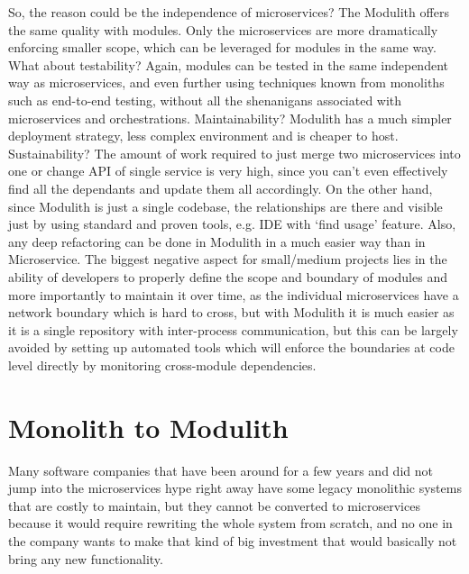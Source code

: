 So, the reason could be the independence of microservices? The Modulith offers the same quality with modules. Only the microservices are more dramatically enforcing smaller scope, which can be leveraged for modules in the same way. What about testability? Again, modules can be tested in the same independent way as microservices, and even further using techniques known from monoliths such as end-to-end testing, without all the shenanigans associated with microservices and orchestrations. Maintainability? Modulith has a much simpler deployment strategy, less complex environment and is cheaper to host. Sustainability? The amount of work required to just merge two microservices into one or change API of single service is very high, since you can't even effectively find all the dependants and update them all accordingly. On the other hand, since Modulith is just a single codebase, the relationships are there and visible just by using standard and proven tools, e.g. IDE with `find usage' feature. Also, any deep refactoring can be done in Modulith in a much easier way than in Microservice. The biggest negative aspect for small/medium projects lies in the ability of developers to properly define the scope and boundary of modules and more importantly to maintain it over time, as the individual microservices have a network boundary which is hard to cross, but with Modulith it is much easier as it is a single repository with inter-process communication, but this can be largely avoided by setting up automated tools which will enforce the boundaries at code level directly by monitoring cross-module dependencies.





\section{Monolith to Modulith}
\label{subsection:monolith_to_modulith}
Many software companies that have been around for a few years and did not jump into the microservices hype right away have some legacy monolithic systems that are costly to maintain, but they cannot be converted to microservices because it would require rewriting the whole system from scratch, and no one in the company wants to make that kind of big investment that would basically not bring any new functionality.

